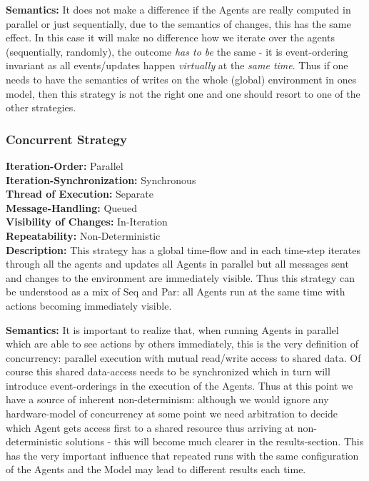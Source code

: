 \textbf{Semantics:} It does not make a difference if the Agents are really computed in parallel or just sequentially, due to the semantics of changes, this has the same effect. In this case it will make no difference how we iterate over the agents (sequentially, randomly), the outcome \textit{has to be} the same - it is event-ordering invariant as all events/updates happen \textit{virtually} at the \textit{same time}. Thus if one needs to have the semantics of writes on the whole (global) environment in ones model, then this strategy is not the right one and one should resort to one of the other strategies.

\subsubsection{Concurrent Strategy}
\textbf{Iteration-Order:} Parallel \\
\textbf{Iteration-Synchronization:}	Synchronous \\
\textbf{Thread of Execution:} Separate \\
\textbf{Message-Handling:} Queued \\
\textbf{Visibility of Changes:}	In-Iteration \\
\textbf{Repeatability:}	Non-Deterministic \\

\textbf{Description:} This strategy has a global time-flow and in each time-step iterates through all the agents and updates all Agents in parallel but all messages sent and changes to the environment are immediately visible. Thus this strategy can be understood as a mix of Seq and Par: all Agents run at the same time with actions becoming immediately visible.

\textbf{Semantics:} It is important to realize that, when running Agents in parallel which are able to see actions by others immediately, this is the very definition of concurrency: parallel execution with mutual read/write access to shared data. Of course this shared data-access needs to be synchronized which in turn will introduce event-orderings in the execution of the Agents. Thus at this point we have a source of inherent non-determinism: although we would ignore any hardware-model of concurrency at some point we need arbitration to decide which Agent gets access first to a shared resource thus arriving at non-deterministic solutions - this will become much clearer in the results-section. This has the very important influence that repeated runs with the same configuration of the Agents and the Model may lead to different results each time.

